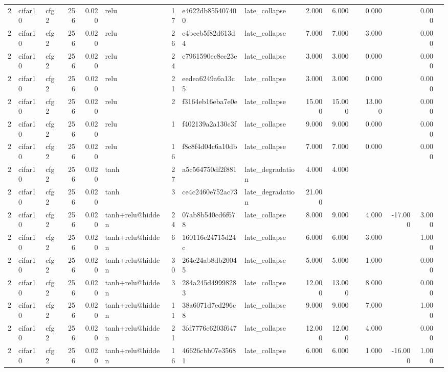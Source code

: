\begin{table}[htbp]
{\begin{tabular}{@{}rllrrlrllrrrrrrr@{}}
2 & cifar10 & cfg2 & 256 & 0.020 & relu & 17 & e4622db855407400 & late\_collapse & 2.000 & 6.000 &  & 0.000 &  & 0.000 &  \\
2 & cifar10 & cfg2 & 256 & 0.020 & relu & 26 & e4bccb5f82d613d4 & late\_collapse & 7.000 & 7.000 &  & 3.000 &  & 0.000 &  \\
2 & cifar10 & cfg2 & 256 & 0.020 & relu & 24 & e7961590ec8ec23e & late\_collapse & 3.000 & 3.000 &  & 0.000 &  & 0.000 &  \\
2 & cifar10 & cfg2 & 256 & 0.020 & relu & 21 & eedea6249a6a13c5 & late\_collapse & 3.000 & 3.000 &  & 0.000 &  & 0.000 &  \\
2 & cifar10 & cfg2 & 256 & 0.020 & relu & 2 & f3164eb16eba7e0e & late\_collapse & 15.000 & 15.000 &  & 13.000 &  & 0.000 &  \\
2 & cifar10 & cfg2 & 256 & 0.020 & relu & 1 & f402139a2a130c3f & late\_collapse & 9.000 & 9.000 &  & 0.000 &  & 0.000 &  \\
2 & cifar10 & cfg2 & 256 & 0.020 & relu & 16 & f8c8f4d04c6a10db & late\_collapse & 7.000 & 7.000 &  & 0.000 &  & 0.000 &  \\
2 & cifar10 & cfg2 & 256 & 0.020 & tanh & 27 & a5c564750df2f881 & late\_degradation & 4.000 & 4.000 &  &  &  &  &  \\
2 & cifar10 & cfg2 & 256 & 0.020 & tanh & 3 & ce4c2460e752ac73 & late\_degradation & 21.000 &  &  &  &  &  &  \\
2 & cifar10 & cfg2 & 256 & 0.020 & tanh+relu@hidden & 24 & 07ab8b540cd6f678 & late\_collapse & 8.000 & 9.000 &  & 4.000 & -17.000 & 3.000 &  \\
2 & cifar10 & cfg2 & 256 & 0.020 & tanh+relu@hidden & 6 & 160116e24715d24c & late\_collapse & 6.000 & 6.000 &  & 3.000 &  & 1.000 &  \\
2 & cifar10 & cfg2 & 256 & 0.020 & tanh+relu@hidden & 30 & 264c24ab8db20045 & late\_collapse & 5.000 & 5.000 &  & 1.000 &  & 0.000 &  \\
2 & cifar10 & cfg2 & 256 & 0.020 & tanh+relu@hidden & 3 & 284a245d49998283 & late\_collapse & 12.000 & 13.000 &  & 8.000 &  & 0.000 &  \\
2 & cifar10 & cfg2 & 256 & 0.020 & tanh+relu@hidden & 11 & 38a6071d7ed296c8 & late\_collapse & 9.000 & 9.000 &  & 7.000 &  & 1.000 &  \\
2 & cifar10 & cfg2 & 256 & 0.020 & tanh+relu@hidden & 21 & 3fd7776e6203f647 & late\_collapse & 12.000 & 12.000 &  & 4.000 &  & 0.000 &  \\
2 & cifar10 & cfg2 & 256 & 0.020 & tanh+relu@hidden & 16 & 46626cbb07e35681 & late\_collapse & 6.000 & 6.000 &  & 1.000 & -16.000 & 1.000 &  \\

\end{tabular}}
\end{table}
